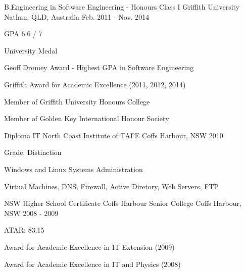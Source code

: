 

\begin{cventries}

  \cventry
    {B.Engineering in Software Engineering - Honours Class I} %
    {Griffith University} %
    {Nathan, QLD, Australia} %
    {Feb. 2011 - Nov. 2014} %
    {
      \begin{cvitems} %
        \item {GPA 6.6 / 7}
        \item {University Medal}
        \item {Geoff Dromey Award - Highest GPA in Software Engineering}
        \item {Griffith Award for Academic Excellence (2011, 2012, 2014)}
        \item {Member of Griffith University Honours College}
        \item {Member of Golden Key International Honour Society}
      \end{cvitems}
    }

  \cventry
    {Diploma IT}
    {North Coast Institute of TAFE}
    {Coffs Harbour, NSW}
    {2010}
    {
      \begin {cvitems}
        \item {Grade: Distinction}
        \item {Windows and Linux Systems Administration}
        \item {Virtual Machines, DNS, Firewall, Active Diretory, Web Servers, FTP}
      \end{cvitems}
    }

    \cventry
    {NSW Higher School Certificate}
    {Coffs Harbour Senior College}
    {Coffs Harbour, NSW}
    {2008 - 2009}
    {
      \begin{cvitems}
        \item {ATAR: 83.15}
        \item {Award for Academic Excellence in IT Extension (2009)}
        \item {Award for Academic Excellence in IT and Physics (2008)}
      \end{cvitems}
    }

\end{cventries}
